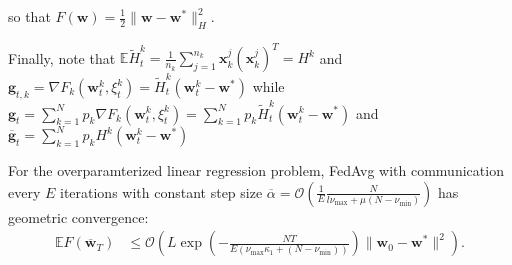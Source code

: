 so that $F(\mathbf{w})=\frac{1}{2}\|\mathbf{w}-\mathbf{w}^{\ast}\|_{H}^{2}$.

Finally, note that $\mathbb{E}\tilde{H}_{t}^{k}=\frac{1}{n_{k}}\sum_{j=1}^{n_{k}}\mathbf{x}_{k}^{j}(\mathbf{x}_{k}^{j})^{T}=H^{k}$
and $\mathbf{g}_{t,k}=\nabla F_{k}(\mathbf{w}_{t}^{k},\xi_{t}^{k})=\tilde{H}_{t}^{k}(\mathbf{w}_{t}^{k}-\mathbf{w}^{\ast})$
while $\mathbf{g}_{t}=\sum_{k=1}^{N}p_{k}\nabla F_{k}(\mathbf{w}_{t}^{k},\xi_{t}^{k})=\sum_{k=1}^{N}p_{k}\tilde{H}_{t}^{k}(\mathbf{w}_{t}^{k}-\mathbf{w}^{\ast})$ and $\overline{\mathbf{g}}_{t}=\sum_{k=1}^{N}p_{k}H^{k}(\mathbf{w}_{t}^{k}-\mathbf{w}^{\ast})$ 
\\
	\begin{thm}
		For the overparamterized linear regression problem, FedAvg with communication every $E$
		iterations with constant step size $\overline{\alpha}=\mathcal{O}(\frac{1}{E}\frac{N}{l\nu_{\max}+\mu(N-\nu_{\min})})$
		has geometric convergence:
		\begin{align*}
		\mathbb{E}F(\overline{\mathbf{w}}_{T}) & \leq\mathcal{O}\left(L\exp(-\frac{NT}{E(\nu_{\max}\kappa_{1}+(N-\nu_{\min}))})\|\mathbf{w}_{0}-\mathbf{w}^{\ast}\|^{2}\right).
		\end{align*}
	\end{thm}
